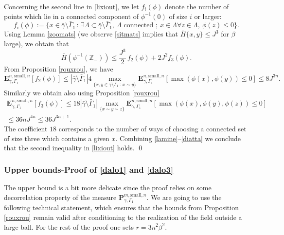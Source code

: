 \documentclass[10pt]{amsart}
\newcommand{\sep}{\,:\,}
\numberwithin{equation}{section}
\theoremstyle{plain}
\theoremstyle{definition}
\newcommand{\sm}{\mathrm{small}}
\newcommand{\bP}{{\ensuremath{\mathbf P}} }
\newcommand{\bE}{{\ensuremath{\mathbf E}} }
\newcommand{\bbZ}{{\ensuremath{\mathbb Z}} }
\newcommand{\gb}{\beta}
\newcommand{\gG}{\Gamma}
\newcommand{\gL}{\Lambda}
\begin{document}
Concerning the second line in \eqref{lixiout}, we let $f_{i}(\phi)$ denote the number
of points which lie in a connected component of $\phi^{-1}(0)$ of size $i$ or larger:\vspace*{-3pt}
\begin{equation*}
f_{i}(\phi):=\{ x\in \bar\gamma \setminus \bar \gG_1 \sep \exists \gL\subset \bar\gamma \setminus \bar \gG_1,\ \gL \text{ connected };\ x\in \gL \forall z\in \gL, \ \phi(z)\le 0 \}.
\end{equation*}
Using Lemma \ref{zoomats} (we observe \eqref{sitmats} implies that $\bar H \{ x,y\} \le J^3$ for $\gb$ large), we obtain that\vspace*{-3pt}
\begin{equation}\label{lamine}
\bar H(\phi^{-1}(\bbZ_-))\le \frac{J^{3}}{2}\,f_2(\phi)+ 2 J^{2}f_{3}(\phi).
\end{equation}
From Proposition \ref{rouxrou}, we have
\begin{equation*}
\bE^{n,\sm,n}_{\gamma,\gG_1}[f_2(\phi)]
\le |\bar \gamma \setminus \bar \gG_1|4\max_{\{x,y \in \bar \gamma \setminus \bar \gG_1 \sep x\sim y\}}\bE^{n,\sm,n}_{\gamma,\gG_1}[ \max(\phi(x),\phi(y))\le 0]
\le 8 J^{3n}.
\end{equation*}
Similarly we obtain also using Proposition \ref{rouxrou}\vspace*{-3pt}\enlargethispage{.5\baselineskip}%
\begin{multline}\label{diatta}
\bE^{n,\sm,n}_{\gamma,\gG_1}[f_3(\phi)]\le 18
|\bar \gamma \setminus \bar\gG_1| \max_{\{x\sim y \sim z\}} \bE^{n,\sm,n}_{\gamma,\gG_1}[ \max(\phi(x),\phi(y),\phi(z))\le 0]\\[-3pt]
\le 36n J^{4n}\le 36 J^{3n+1}.
\end{multline}
The coefficient $18$ corresponds to the number of ways of choosing a connected set of size three which contains a given $x$.
Combining \eqref{lamine}--\eqref{diatta} we conclude that the second inequality in \eqref{lixiout} holds.
\qed

\subsubsection{Upper bounds-Proof of \eqref{dalo1} and \eqref{dalo3}}

The upper bound is a bit more delicate since the proof relies on some decorrelation property of the measure $\bP^{m,\sm,n}_{\gamma,\gG_1}$.
We are going to use the following technical statement, which ensures that the bounds from
Proposition \ref{rouxrou} remain valid after conditioning to the realization of the field outside a large ball.
For the rest of the proof one sets $r=3n^2\gb^2$.
\end{document}
